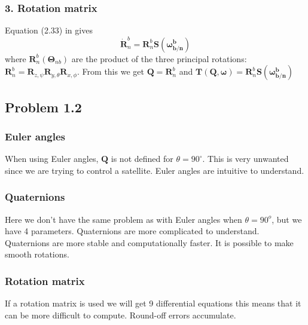 \subsubsection*{3. Rotation matrix}
Equation (2.33) in \cite{Fossen2011} gives
\begin{equation}
    \dot{\boldsymbol{R}}_n^b = \boldsymbol{R}_n^b\boldsymbol{S(\boldsymbol{\omega}_{b/n}^b)}
\end{equation}
where $\boldsymbol{R}_n^b(\boldsymbol{\Theta}_{nb})$ are the product of the three principal rotations: $\boldsymbol{R}_n^b = \boldsymbol{R}_{z,\psi}\boldsymbol{R}_{y,\theta}\boldsymbol{R}_{x,\phi}$. From this we get $\boldsymbol{Q} = \boldsymbol{R}_n^b$ and $\boldsymbol{T}(\boldsymbol{Q},\boldsymbol{\omega}) = \boldsymbol{R}_n^b\boldsymbol{S(\boldsymbol{\omega}_{b/n}^b)}$







\subsection*{Problem 1.2}
\subsubsection*{Euler angles}
When using Euler angles, $\boldsymbol{Q}$ is not defined for $\theta = 90^\circ$. This is very unwanted since we are trying to control a satellite. Euler angles are intuitive to understand. 

\subsubsection*{Quaternions}
Here we don't have the same problem as with Euler angles when $\theta = 90^o$, but we have 4 parameters. Quaternions are more complicated to understand.  Quaternions are more stable and computationally faster. It is possible to make smooth rotations. 
\subsubsection*{Rotation matrix}
If a rotation matrix is used we will get 9 differential equations this means that it can be more difficult to compute. Round-off errors accumulate. 

